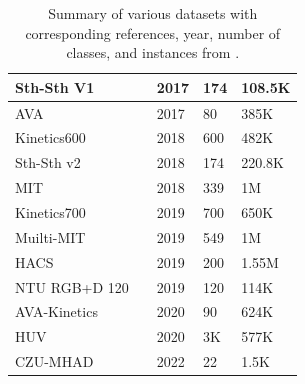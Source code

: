 \begin{table}
\begin{tabular}{|l|l|l|l|l|}
        Sth-Sth V1 & \textcite{dataset:something_something} & 2017 & 174 & 108.5K \\ \hline
        AVA & \textcite{gu2018avavideodatasetspatiotemporally} & 2017 & 80 & 385K \\ \hline
        Kinetics600 & \textcite{carreira_2017_i3d_quo_vadis} & 2018 & 600 & 482K \\ \hline
        Sth-Sth v2 & \textcite{dataset:something_something} & 2018 & 174 & 220.8K \\ \hline
        MIT & \textcite{monfort2021multimomentstimelearninginterpreting} & 2018 & 339 & 1M \\ \hline
        Kinetics700 & \textcite{carreira2022shortnotekinetics700human} & 2019 & 700 & 650K \\ \hline
        Muilti-MIT & \textcite{monfort2021multimomentstimelearninginterpreting} & 2019 & 549 & 1M \\ \hline
        HACS & \textcite{dataset:hacs} & 2019 & 200 & 1.55M \\ \hline
        NTU RGB+D 120 & \textcite{Liu_2020} & 2019 & 120 & 114K \\ \hline
        AVA-Kinetics & \textcite{li2020avakineticslocalizedhumanactions} & 2020 & 90 & 624K \\ \hline
        HUV & \textcite{diba2020largescaleholisticvideo} & 2020 & 3K & 577K \\ \hline
        CZU-MHAD & \textcite{9707787} & 2022 & 22 & 1.5K \\ \hline
    \end{tabular}
    \caption{Summary of various datasets with corresponding references, year, number of classes, and instances from \textcite{survey_of_survey}.}
    \label{tab:datasets_summary}
\end{table}

